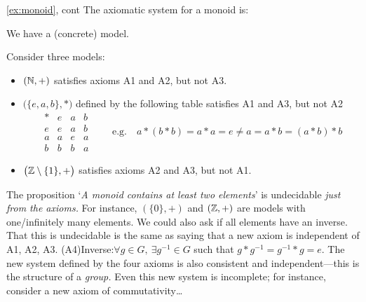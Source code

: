 \begin{example*}{\ref{ex:monoid}, cont}{}
	The axiomatic system for a monoid is:\vspace{-2pt}
	\begin{description}\itemsep2pt
		\item[\normalfont\emph{Consistent}] We have a (concrete) model.
		\item[\normalfont\emph{Independent}] Consider three models:
		\begin{itemize}\itemsep0pt
		  \item $(\mathbb{N},+)$ satisfies axioms A1 and A2, but not A3.
		  \item $\bigl(\{e,a,b\},*\bigr)$ defined by the following table satisfies A1 and A3, but not A2
		  \[
		  	\begin{array}{c||ccc}
		  		*&e&a&b\\\hline\hline
		  		e&e&a&b\\
		  		a&a&e&a\\
		  		b&b&b&a
		  	\end{array}
		  	\qquad \text{e.g.}\quad 
		  	a*(b*b)=a*a=e\neq a=a*b=(a*b)*b
		  	\]
		  \item $\bigl(\mathbb{Z}\setminus\{1\},+\bigr)$ satisfies axioms A2 and A3, but not A1.
		\end{itemize}
		\item[\normalfont\emph{Incomplete}] The proposition `\emph{A monoid contains at least two elements}' is undecidable \emph{just from the axioms.} For instance, $(\{0\},+)$ and $(\mathbb{Z},+)$ are models with one/infinitely many elements.\smallbreak
		  We could also ask if all elements have an inverse. That this is undecidable is the same as saying that a new axiom is independent of A1, A2, A3.\smallbreak
		  \lstsp\lstsp\lstsp(A4)\lstsp Inverse:\quad $\forall g\in G,\ \exists g^{-1}\in G$ such that $g\ast g^{-1}=g^{-1}\ast g=e$.\smallbreak
		The new system defined by the four axioms is also consistent and independent---this is the structure of a \emph{group.} Even this new system is incomplete; for instance, consider a new axiom of commutativity\ldots
	\end{description} 
\end{example*}


\goodbreak


